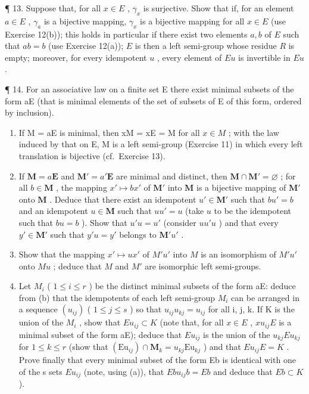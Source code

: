 ¶ 13. Suppose that, for all \(x \in E\) , \(\gamma_x\) is surjective. Show that if, for an element \(a \in E\) , \(\gamma_a\) is a bijective mapping, \(\gamma_x\) is a bijective mapping for all \(x \in E\) (use Exercise 12(b)); this holds in particular if there exist two elements \(a, b\) of \(E\) such that \(ab = b\) (use Exercise 12(a)); \(E\) is then a left semi-group whose residue \(R\) is empty; moreover, for every idempotent \(u\) , every element of \(Eu\) is invertible in \(Eu\) .

¶ 14. For an associative law on a finite set E there exist minimal subsets of the form aE (that is minimal elements of the set of subsets of E of this form, ordered by inclusion).

\begin{enumerate}
\def\labelenumi{(\alph{enumi})}
\item
  If M = aE is minimal, then xM = xE = M for all \(x \in M\) ; with the law induced by that on E, M is a left semi-group (Exercise 11) in which every left translation is bijective (cf.~Exercise 13).
\item
  If \(\mathbf{M} = a\mathbf{E}\) and \(\mathbf{M}' = a'\mathbf{E}\) are minimal and distinct, then \(\mathbf{M} \cap \mathbf{M}' = \varnothing\) ; for all \(b \in \mathbf{M}\) , the mapping \(x' \mapsto bx'\) of \(\mathbf{M}'\) into \(\mathbf{M}\) is a bijective mapping of \(\mathbf{M}'\) onto \(\mathbf{M}\) . Deduce that there exist an idempotent \(u' \in \mathbf{M}'\) such that \(bu' = b\) and an idempotent \(u \in \mathbf{M}\) such that \(uu' = u\) (take \(u\) to be the idempotent such that \(bu = b\) ). Show that \(u'u = u'\) (consider \(uu'u\) ) and that every \(y' \in \mathbf{M}'\) such that \(y'u = y'\) belongs to \(\mathbf{M}'u'\) .
\item
  Show that the mapping \(x' \mapsto ux'\) of \(M'u'\) into \(M\) is an isomorphism of \(M'u'\) onto \(Mu\) ; deduce that \(M\) and \(M'\) are isomorphic left semi-groups.
\item
  Let \(M_{i}\) ( \(1 \leqslant i \leqslant r\) ) be the distinct minimal subsets of the form aE: deduce from (b) that the idempotents of each left semi-group \(M_{i}\) can be arranged in a sequence \((u_{ij})\) ( \(1 \leqslant j \leqslant s\) ) so that \(u_{ij}u_{kj} = u_{ij}\) for all i, j, k. If K is the union of the \(M_{i}\) , show that \(Eu_{ij} \subset K\) (note that, for all \(x \in E\) , \(xu_{ij}E\) is a minimal subset of the form aE); deduce that \(Eu_{ij}\) is the union of the \(u_{kj}Eu_{kj}\) for \(1 \leqslant k \leqslant r\) (show that \((\mathrm{Eu}_{ij}) \cap \mathbf{M}_{k} = u_{kj}\mathrm{Eu}_{kj}\) ) and that \(Eu_{ij}E = K\) . Prove finally that every minimal subset of the form Eb is identical with one of the s sets \(Eu_{ij}\) (note, using (a)), that \(Ebu_{ij}b = Eb\) and deduce that \(Eb \subset K\) ).
\end{enumerate}

